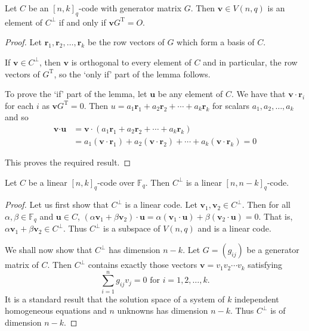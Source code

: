 \begin{lemma}
\label{perpIffvGT=O}
    Let $C$ be an $[n,k]_q$-code with generator matrix $G$. Then $\textbf{v}\in V(n,q)$ is an element of $C^\perp$ if and only if $\textbf{v}G^\text{T}=O$.
\end{lemma}
\begin{proof}
    Let $\textbf{r}_1,\textbf{r}_2,\ldots,\textbf{r}_k$ be the row vectors of $G$ which form a basis of $C$.
    
    If $\textbf{v}\in C^\perp$, then $\textbf{v}$ is orthogonal to every element of $C$ and in particular, the row vectors of $G^\text{T}$, so the `only if' part of the lemma follows.
    
    To prove the `if' part of the lemma, let $\textbf{u}$ be any element of $C$. We have that $\textbf{v}\cdot\textbf{r}_i$ for each $i$ as $\textbf{v}G^\text{T}=0$. Then $u=a_1\textbf{r}_1+a_2\textbf{r}_2+\cdots+a_k\textbf{r}_k$ for scalars $a_1,a_2,\ldots,a_k$ and so
    \begin{align*}
        \textbf{v}\cdot \textbf{u} &= \textbf{v}\cdot(a_1\textbf{r}_1+a_2\textbf{r}_2+\cdots+a_k\textbf{r}_k) \\
                                  &= a_1(\textbf{v}\cdot\textbf{r}_1)+a_2(\textbf{v}\cdot\textbf{r}_2)+\cdots+a_k(\textbf{v}\cdot\textbf{r}_k) = 0
    \end{align*}
    
    This proves the required result.
\end{proof}

\begin{theorem}
\label{dimDual}
    Let $C$ be a linear $[n,k]_q$-code over $\mathbb{F}_q$. Then $C^\perp$ is a linear $[n,n-k]_q$-code.
\end{theorem}
\begin{proof}
    Let us first show that $C^\perp$ is a linear code. Let $\textbf{v}_1,\textbf{v}_2\in C^\perp$. Then for all $\alpha,\beta\in \mathbb{F}_q$ and $\textbf{u}\in C$, $(\alpha \textbf{v}_1+\beta \textbf{v}_2)\cdot \textbf{u}=\alpha(\textbf{v}_1\cdot \textbf{u})+\beta(\textbf{v}_2\cdot \textbf{u})=0$. That is, $\alpha \textbf{v}_1+\beta \textbf{v}_2\in C^\perp$. Thus $C^\perp$ is a subspace of $V(n,q)$ and is a linear code.
    
    We shall now show that $C^\perp$ has dimension $n-k$. Let $G=(g_{ij})$ be a generator matrix of $C$. Then $C^\perp$ contains exactly those vectors $\textbf{v}=v_1v_2\cdots v_k$ satisfying
    $$\sum_{i=1}^n g_{ij}v_j=0\text{ for }i=1,2,\ldots,k.$$
    It is a standard result that the solution space of a system of $k$ independent homogeneous equations and $n$ unknowns has dimension $n-k$. Thus $C^\perp$ is of dimension $n-k$.
\end{proof}

